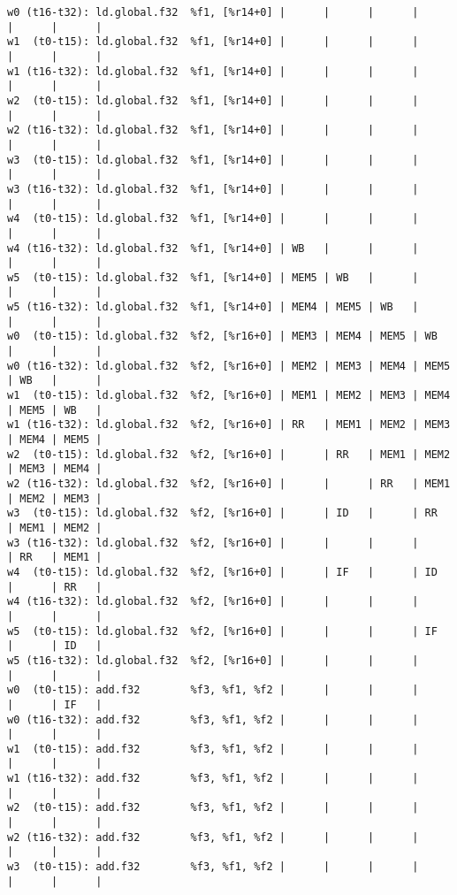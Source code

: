 \documentclass[11pt]{article}
\begin{document}
\begin{Answer}
\begin{verbatim}
w0 (t16-t32): ld.global.f32  %f1, [%r14+0] |      |      |      |      |      |      |
w1  (t0-t15): ld.global.f32  %f1, [%r14+0] |      |      |      |      |      |      |
w1 (t16-t32): ld.global.f32  %f1, [%r14+0] |      |      |      |      |      |      |
w2  (t0-t15): ld.global.f32  %f1, [%r14+0] |      |      |      |      |      |      |
w2 (t16-t32): ld.global.f32  %f1, [%r14+0] |      |      |      |      |      |      |
w3  (t0-t15): ld.global.f32  %f1, [%r14+0] |      |      |      |      |      |      |
w3 (t16-t32): ld.global.f32  %f1, [%r14+0] |      |      |      |      |      |      |
w4  (t0-t15): ld.global.f32  %f1, [%r14+0] |      |      |      |      |      |      |
w4 (t16-t32): ld.global.f32  %f1, [%r14+0] | WB   |      |      |      |      |      |
w5  (t0-t15): ld.global.f32  %f1, [%r14+0] | MEM5 | WB   |      |      |      |      |
w5 (t16-t32): ld.global.f32  %f1, [%r14+0] | MEM4 | MEM5 | WB   |      |      |      |
w0  (t0-t15): ld.global.f32  %f2, [%r16+0] | MEM3 | MEM4 | MEM5 | WB   |      |      |
w0 (t16-t32): ld.global.f32  %f2, [%r16+0] | MEM2 | MEM3 | MEM4 | MEM5 | WB   |      |
w1  (t0-t15): ld.global.f32  %f2, [%r16+0] | MEM1 | MEM2 | MEM3 | MEM4 | MEM5 | WB   |
w1 (t16-t32): ld.global.f32  %f2, [%r16+0] | RR   | MEM1 | MEM2 | MEM3 | MEM4 | MEM5 |
w2  (t0-t15): ld.global.f32  %f2, [%r16+0] |      | RR   | MEM1 | MEM2 | MEM3 | MEM4 |
w2 (t16-t32): ld.global.f32  %f2, [%r16+0] |      |      | RR   | MEM1 | MEM2 | MEM3 |
w3  (t0-t15): ld.global.f32  %f2, [%r16+0] |      | ID   |      | RR   | MEM1 | MEM2 |
w3 (t16-t32): ld.global.f32  %f2, [%r16+0] |      |      |      |      | RR   | MEM1 |
w4  (t0-t15): ld.global.f32  %f2, [%r16+0] |      | IF   |      | ID   |      | RR   |
w4 (t16-t32): ld.global.f32  %f2, [%r16+0] |      |      |      |      |      |      |
w5  (t0-t15): ld.global.f32  %f2, [%r16+0] |      |      |      | IF   |      | ID   |
w5 (t16-t32): ld.global.f32  %f2, [%r16+0] |      |      |      |      |      |      |
w0  (t0-t15): add.f32        %f3, %f1, %f2 |      |      |      |      |      | IF   |
w0 (t16-t32): add.f32        %f3, %f1, %f2 |      |      |      |      |      |      |
w1  (t0-t15): add.f32        %f3, %f1, %f2 |      |      |      |      |      |      |
w1 (t16-t32): add.f32        %f3, %f1, %f2 |      |      |      |      |      |      |
w2  (t0-t15): add.f32        %f3, %f1, %f2 |      |      |      |      |      |      |
w2 (t16-t32): add.f32        %f3, %f1, %f2 |      |      |      |      |      |      |
w3  (t0-t15): add.f32        %f3, %f1, %f2 |      |      |      |      |      |      |

\end{verbatim}
\end{Answer}
\end{document}
